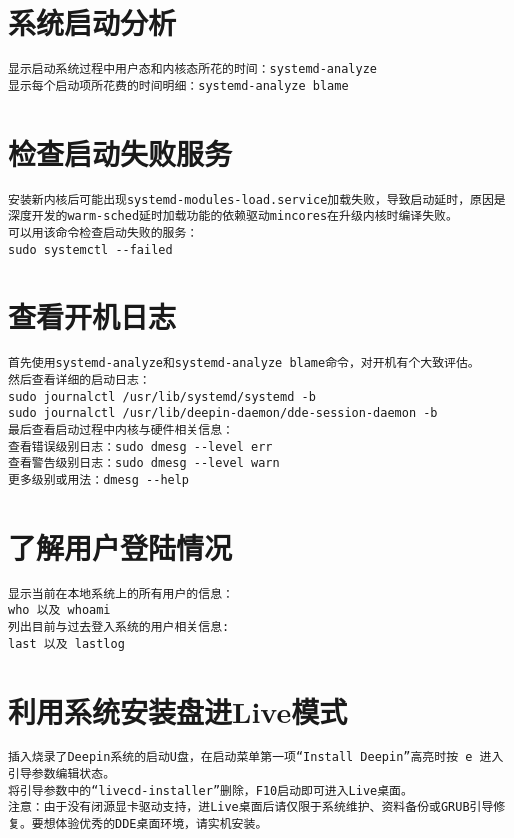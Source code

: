 \documentclass[a4paper,fontset=fandol,zihao=-4,linespread=1.2]{ctexbook}
\begin{document}
\section{系统启动分析}
\begin{lstlisting}
显示启动系统过程中用户态和内核态所花的时间：systemd-analyze
显示每个启动项所花费的时间明细：systemd-analyze blame
\end{lstlisting}

\section{检查启动失败服务}
\begin{lstlisting}
安装新内核后可能出现systemd-modules-load.service加载失败，导致启动延时，原因是深度开发的warm-sched延时加载功能的依赖驱动mincores在升级内核时编译失败。
可以用该命令检查启动失败的服务：
sudo systemctl --failed
\end{lstlisting}

\section{查看开机日志}
\begin{lstlisting}
首先使用systemd-analyze和systemd-analyze blame命令，对开机有个大致评估。
然后查看详细的启动日志：
sudo journalctl /usr/lib/systemd/systemd -b
sudo journalctl /usr/lib/deepin-daemon/dde-session-daemon -b
最后查看启动过程中内核与硬件相关信息：
查看错误级别日志：sudo dmesg --level err
查看警告级别日志：sudo dmesg --level warn
更多级别或用法：dmesg --help
\end{lstlisting}

\section{了解用户登陆情况}
\begin{lstlisting}
显示当前在本地系统上的所有用户的信息：
who 以及 whoami
列出目前与过去登入系统的用户相关信息:
last 以及 lastlog
\end{lstlisting}

\section{利用系统安装盘进Live模式}
\begin{lstlisting}
插入烧录了Deepin系统的启动U盘，在启动菜单第一项“Install Deepin”高亮时按 e 进入引导参数编辑状态。
将引导参数中的“livecd-installer”删除，F10启动即可进入Live桌面。
注意：由于没有闭源显卡驱动支持，进Live桌面后请仅限于系统维护、资料备份或GRUB引导修复。要想体验优秀的DDE桌面环境，请实机安装。
\end{lstlisting}
\end{document}
